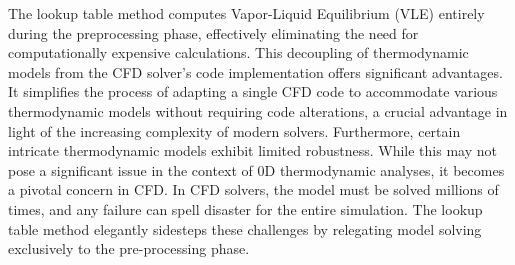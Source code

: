 
The lookup table method computes Vapor-Liquid Equilibrium (VLE) entirely during the preprocessing phase, effectively eliminating the need for computationally expensive calculations. This decoupling of thermodynamic models from the CFD solver's code implementation offers significant advantages. It simplifies the process of adapting a single CFD code to accommodate various thermodynamic models without requiring code alterations, a crucial advantage in light of the increasing complexity of modern solvers. Furthermore, certain intricate thermodynamic models exhibit limited robustness. While this may not pose a significant issue in the context of 0D thermodynamic analyses, it becomes a pivotal concern in CFD. In CFD solvers, the model must be solved millions of times, and any failure can spell disaster for the entire simulation. The lookup table method elegantly sidesteps these challenges by relegating model solving exclusively to the pre-processing phase.



